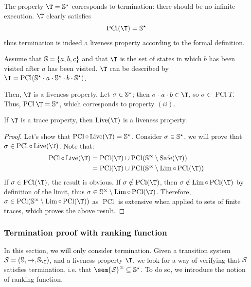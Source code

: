 \documentclass[toc]{../cs-classes/cs-classes}
\DeclareMathOperator{\pcl}{PCl}
\DeclareMathOperator{\Lim}{Lim}
\DeclareMathOperator{\safe}{Safe}
\DeclareMathOperator{\live}{Live}
\begin{document}
\begin{example}[Termination]
    The property $\T = \S^\star$ corresponds to termination: there should be no infinite execution. $\T$ clearly satisfies
    \begin{equation*}
        \pcl(\T) = \S^\star
    \end{equation*}
    thus termination is indeed a liveness property according to the formal definition.
\end{example}

\begin{example}
    Assume that $\S = \{a, b, c\}$ and that $\T$ is the set of states in which $b$ has been visited after $a$ has been visited. $\T$ can be described by $\T = \pcl(\S^\star \cdot a \cdot \S^\star \cdot b \cdot \S^\star)$. 

    Then, $\T$ is a liveness property. Let $\sigma\in\S^\star$; then $\sigma\cdot a\cdot b \in \T$, so $\sigma\in\pcl{T}$. Thus, $\pcl{\T} = \S^\star$, which corresponds to property $(ii)$.
\end{example}

\begin{theorem}[$\live$ is idempotent]
    If $\T$ is a trace property, then $\live(\T)$ is a liveness property.
\end{theorem}
\begin{proof}
    Let's show that $\pcl\circ\live(\T)=\S^\star$. Consider $\sigma\in\S^\star$, we will prove that $\sigma\in\pcl\circ\live(\T)$. Note that:
    \begin{equation*}
        \begin{aligned}
            \pcl\circ\live(\T) &= \pcl(\T)\cup\pcl(\S^\propto\setminus\safe(\T)) \\
            &= \pcl(\T)\cup\pcl(\S^\propto\setminus\Lim\circ\pcl(\T))
        \end{aligned}
    \end{equation*}
    If $\sigma\in\pcl(\T)$, the result is obvious. If $\sigma\notin\pcl(\T)$, then $\sigma\notin\Lim\circ\pcl(\T)$ by definition of the limit, thus $\sigma\in\S^\propto\setminus\Lim\circ\pcl(\T)$. Therefore, $\sigma\in\pcl(\S^\propto\setminus\Lim\circ\pcl(\T))$ as $\pcl$ is extensive when applied to sets of finite traces, which proves the above result.
\end{proof}

\subsubsection{Termination proof with ranking function}
In this section, we will only consider termination. Given a transition system $\Sc=(\S, \to, \S_{\I})$, and a liveness property $\T$, we look for a way of verifying that $\Sc$ satisfies termination, i.e. that $\sem{\Sc}^\propto\subseteq\S^\star$. To do so, we introduce the notion of ranking function.
\end{document}
